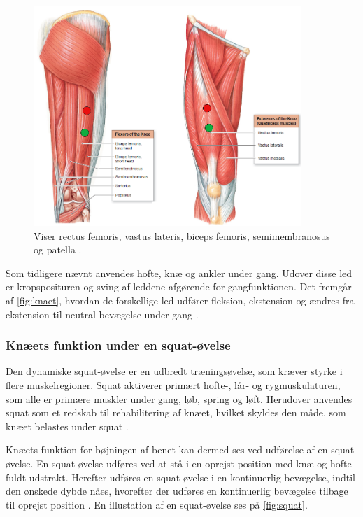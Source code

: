 \begin{figure} [H]
\centering
\includegraphics[width=0.9\textwidth]{figures/laarmuskler}
\caption{Viser rectus femoris, vastus lateris, biceps femoris, semimembranosus og patella  \citep{martini2012}.}
\label{fig:knaet}
\end{figure} 


Som tidligere nævnt anvendes hofte, knæ og ankler under gang. Udover disse led er kropsposituren og sving af leddene afgørende for gangfunktionen. Det fremgår af \autoref{fig:knaet}, hvordan de forskellige led udfører fleksion, ekstension og ændres fra ekstension til neutral bevægelse under gang \citep{martini2012}.

\subsubsection{Knæets funktion under en squat-øvelse} \label{sec:knaeled_squat}
Den dynamiske squat-øvelse er en udbredt træningsøvelse, som kræver styrke i flere muskelregioner. Squat aktiverer primært hofte-, lår- og rygmuskulaturen, som alle er primære muskler under gang, løb, spring og løft. Herudover anvendes squat som et redskab til rehabilitering af knæet, hvilket skyldes den måde, som knæet belastes under squat \citep{escamilla2001}. 

Knæets funktion for bøjningen af benet kan dermed ses ved udførelse af en squat-øvelse. En squat-øvelse udføres ved at stå i en oprejst position med knæ og hofte fuldt udstrakt. Herefter udføres en squat-øvelse i en kontinuerlig bevægelse, indtil den ønskede dybde nåes, hvorefter der udføres en kontinuerlig bevægelse tilbage til oprejst position \citep{escamilla2001}. En illustation af en squat-øvelse ses på \autoref{fig:squat}.

